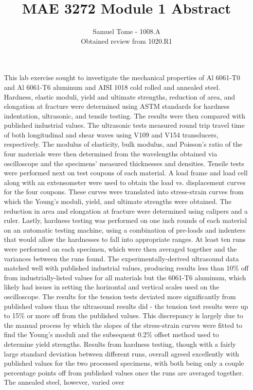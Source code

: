 \documentclass[10pt]{article}
\begin{document}
 

 
\title{MAE 3272 Module 1 Abstract}
\author{Samuel Tome - 1008.A \\ Obtained review from 1020.R1}
\maketitle


This lab exercise sought to investigate the mechanical properties of Al 6061-T0 and Al 6061-T6 aluminum and AISI 1018 cold rolled and annealed steel.  Hardness, elastic moduli, yield and ultimate strengths, reduction of area, and elongation at fracture were determined using ASTM standards for hardness indentation, ultrasonic, and tensile testing.  The results were then compared with published industrial values.  The ultrasonic tests measured round trip travel time of both longitudinal and shear waves using V109 and V154 transducers, respectively.   The modulus of elasticity, bulk modulus, and Poisson's ratio of the four materials were then determined from the wavelengths obtained via oscilloscope and the specimens' measured thicknesses and densities.    Tensile tests were performed next on test coupons of each material.  A load frame and load cell along with an extensometer were used to obtain the load vs. displacement curves for the four coupons.  These curves were translated into stress-strain curves from which the Young's moduli, yield, and ultimate strengths were obtained.  The reduction in area and elongation at fracture were determined using calipers and a ruler.  Lastly, hardness testing was performed on one inch rounds of each material on an automatic testing machine, using a combination of pre-loads and indenters that would allow the hardnesses to fall into appropriate ranges.  At least ten runs were performed on each specimen, which were then averaged together and the variances between the runs found.  The experimentally-derived ultrasound data matched well with published industrial values, producing results less than 10\% off from industrially-listed values for all materials but the 6061-T6 aluminum, which likely had issues in setting the horizontal and vertical scales used on the oscilloscope.  The results for the tension tests deviated more significantly from published values than the ultrasound results did - the tension test results were up to 15\% or more off from the published values.  This discrepancy is largely due to the manual process by which the slopes of the stress-strain curves were fitted to find the Young's moduli and the subsequent 0.2\% offset method used to determine yield strengths.  Results from hardness testing, though with a fairly large standard deviation between different runs, overall agreed excellently with published values for the two processed specimens, with both being only a couple percentage points off from published values once the runs are averaged together.  The annealed steel, however, varied over 
\end{document}
